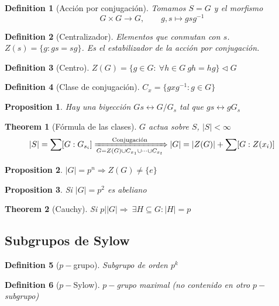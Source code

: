 \documentclass[leqno]{article}
\newtheorem*{theorem}{Theorem}
\newtheorem*{proposition}{Proposition}
\newtheorem*{definition}{Definition}
\begin{document}
\begin{definition}[Acción por conjugación] Tomamos $S = G$ y el morfismo
  \[
  G\times G \to  G, \qquad g, s \mapsto gsg^{-1} 
  \] 
\end{definition}

\begin{definition}[Centralizador]  Elementos que conmutan con  $s$. $Z(s) = \{g: gs = sg\}$. Es el estabilizador de la acción por conjugación.
\end{definition}

\begin{definition}[Centro] $Z(G) = \{g\in G: \ \forall h\in G \ gh =hg\} \triangleleft G$
\end{definition}

\begin{definition}[Clase de conjugación] $C_x = \{gxg^{-1}: g\in G\}$
\end{definition}

\begin{proposition}
  Hay una biyección $Gs \leftrightarrow G/G_s$ tal que $gs \leftrightarrow gG_s$
\end{proposition}

\begin{theorem}[Fórmula de las clases] $G$ actua sobre  $S$,  $|S|<\infty $
\[
|S| = \sum [G:G_{s_i}] \xRightarrow[G = Z(G) \cup C_{x_1}\cup \cdots \cup C_{x_t}]{ \text{Conjugación}} |G| = |Z(G)| + \sum [G:Z(x_i)]
\] 
\end{theorem}

\begin{proposition}
$|G|=p^n \Rightarrow Z(G)\neq \{e\}$ 
\end{proposition}

\begin{proposition}
Si $|G|=p^2$ es abeliano 
\end{proposition}

\begin{theorem}[Cauchy] Si $p||G| \Rightarrow \ \exists H\subseteq G: |H|=p$
\end{theorem}

\subsection{Subgrupos de Sylow}
\begin{definition}[$p-$grupo] Subgrupo de orden $p^k$
\end{definition}

\begin{definition}[$p-$Sylow] $p-$grupo maximal (no contenido en otro $p-$subgrupo)
\end{definition}
\end{document}
